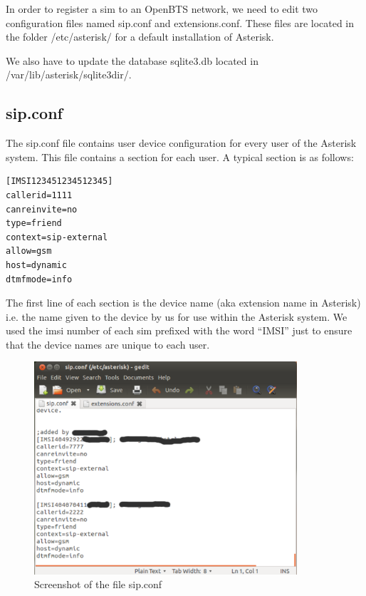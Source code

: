 In order to register a \gls{sim} to an OpenBTS network, we need to edit two 
configuration files named \textsf{sip.conf} and \textsf{extensions.conf}. These
files are located in the folder \textsf{/etc/asterisk/} for a default 
installation of Asterisk.

We also have to update the database \textsf{sqlite3.db} located in
\textsf{/var/lib/asterisk/sqlite3dir/}.

\subsection{sip.conf}

The \textsf{sip.conf} file contains user device configuration for every user of 
the Asterisk system. This file contains a section for each user. A typical 
section is as follows:
\begin{verbatim}
[IMSI123451234512345]
callerid=1111
canreinvite=no
type=friend
context=sip-external
allow=gsm
host=dynamic
dtmfmode=info    
\end{verbatim}

The first line of each section is the device name (aka extension name in
Asterisk) i.e. the name given to the device by us for use within the Asterisk
system. We used the \gls{imsi} number of each \gls{sim} prefixed with 
the word \textsf{``IMSI''}
just to ensure that the device names are unique to each user.

\begin{figure}
  \centering
    \includegraphics[width=0.87\textwidth]{../images/sip_conf}
  \caption[Screenshot - sip.conf]{Screenshot of the file \textsf{sip.conf}}
  \label{sip_conf}
\end{figure}

